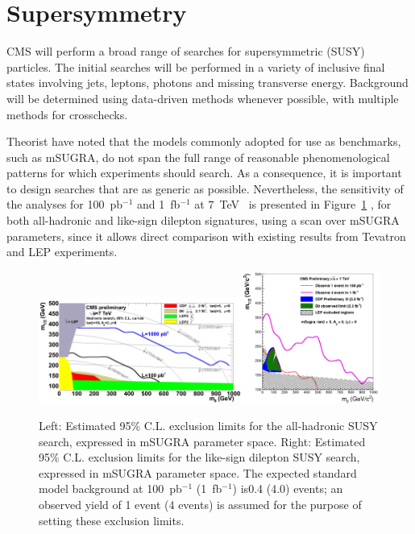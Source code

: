 \documentclass{cmspaper}
\begin{document}
\section{Supersymmetry}
CMS will perform a broad range of searches for supersymmetric (SUSY) particles. The initial searches
will be performed in a variety of inclusive final states involving jets, leptons, photons and missing 
transverse energy. Background will be determined using data-driven  methods whenever possible, with multiple 
methods for crosschecks. 

Theorist have noted that the models commonly adopted for use as benchmarks, such as mSUGRA, 
do not span the full range of reasonable phenomenological patterns for which experiments should search.
As a consequence, it is important to design searches that are as generic as possible.
Nevertheless, the sensitivity of the analyses for 100~pb$^{-1}$ and 1~fb$^{-1}$ 
at $7$~TeV~\cite{CMSPhysicsReach7TeV} is presented in Figure~\ref{fig:SUSY} 
, for both all-hadronic and like-sign dilepton signatures, using a scan over mSUGRA parameters,  
since it allows direct comparison with existing results from Tevatron and LEP experiments.

\begin{figure}[htbp] 
\centering
\includegraphics[width=0.6\textwidth]{SUSY_Fig1.jpg}\includegraphics[width=0.4\textwidth]{SUSY_Fig2.jpg}  
\caption{Left: Estimated 95\% C.L. exclusion limits for the all-hadronic SUSY search, expressed in mSUGRA 
parameter space. Right: Estimated 95\% C.L. exclusion limits for the like-sign dilepton SUSY search, 
expressed in mSUGRA parameter space. The expected standard model background at 100~pb$^{-1}$ (1~fb$^{-1}$) 
is0.4 (4.0) events; an observed yield of 1 event (4 events) is assumed for the purpose of setting these exclusion limits.}
\label{fig:SUSY}
\end{figure}
\end{document}
